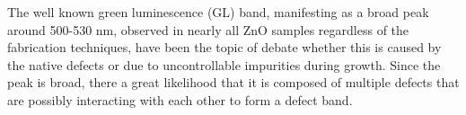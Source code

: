 The well known green luminescence (GL) band, manifesting as a broad peak around 500-530 nm,  observed in nearly all ZnO samples regardless of the fabrication techniques, have been the topic of debate whether this is caused by the native defects or due to uncontrollable impurities during growth. Since the peak is  broad, there a great likelihood that it is composed of multiple defects that are possibly interacting with each other to form a defect band.






